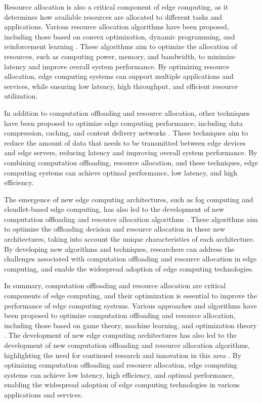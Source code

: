 \documentclass[11pt]{article}
\begin{document}
Resource allocation is also a critical component of edge computing, as it determines how available resources are allocated to different tasks and applications. Various resource allocation algorithms have been proposed, including those based on convex optimization, dynamic programming, and reinforcement learning \cite{ref69}. These algorithms aim to optimize the allocation of resources, such as computing power, memory, and bandwidth, to minimize latency and improve overall system performance. By optimizing resource allocation, edge computing systems can support multiple applications and services, while ensuring low latency, high throughput, and efficient resource utilization.

In addition to computation offloading and resource allocation, other techniques have been proposed to optimize edge computing performance, including data compression, caching, and content delivery networks \cite{ref70}. These techniques aim to reduce the amount of data that needs to be transmitted between edge devices and edge servers, reducing latency and improving overall system performance. By combining computation offloading, resource allocation, and these techniques, edge computing systems can achieve optimal performance, low latency, and high efficiency.

The emergence of new edge computing architectures, such as fog computing and cloudlet-based edge computing, has also led to the development of new computation offloading and resource allocation algorithms \cite{ref71}. These algorithms aim to optimize the offloading decision and resource allocation in these new architectures, taking into account the unique characteristics of each architecture. By developing new algorithms and techniques, researchers can address the challenges associated with computation offloading and resource allocation in edge computing, and enable the widespread adoption of edge computing technologies.

In summary, computation offloading and resource allocation are critical components of edge computing, and their optimization is essential to improve the performance of edge computing systems. Various approaches and algorithms have been proposed to optimize computation offloading and resource allocation, including those based on game theory, machine learning, and optimization theory \cite{ref72}. The development of new edge computing architectures has also led to the development of new computation offloading and resource allocation algorithms, highlighting the need for continued research and innovation in this area \cite{ref73}. By optimizing computation offloading and resource allocation, edge computing systems can achieve low latency, high efficiency, and optimal performance, enabling the widespread adoption of edge computing technologies in various applications and services.
\end{document}
